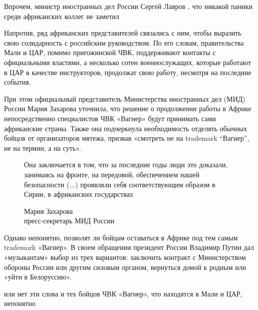 \begin{center}
    \Large

    Впрочем, министр иностранных дел России Сергей Лавров , что никакой паники среди африканских коллег не заметил
\end{center}

Напротив, ряд африканских представителей связались с ним, чтобы выразить свою солидарность с российским руководством. По его словам, правительства Мали и ЦАР, помимо пригожинской ЧВК, поддерживают контакты с официальными властями, а несколько сотен военнослужащих, которые работают в ЦАР в качестве инструкторов, продолжат свою работу, несмотря на последние события.

При этом официальный представитель Министерства иностранных дел (МИД) России Мария Захарова уточнила, что решение о продолжении работы в Африке непосредственно специалистов ЧВК «Вагнер» будут принимать сами африканские страны. Также она подчеркнула необходимость отделять обычных бойцов от организаторов мятежа, призвав «смотреть не на trademark ``Вагнер'', не на термин, а на суть».

\begin{figure}
    \begin{fancyquotes}
        Она заключается в том, что за последние годы люди это доказали, занимаясь на фронте, на передовой, обеспечением нашей безопасности (...) проявляли себя соответствующим образом в Сирии, в африканских государствах

        \begin{flushright}

            Мария Захарова\\

            пресс-секретарь МИД России
        \end{flushright}
    \end{fancyquotes}
\end{figure}
Однако непонятно, позволят ли бойцам оставаться в Африке под тем самым trademark «Вагнер». В своем обращении президент России Владимир Путин дал «музыкантам» выбор из трех вариантов: заключить контракт с Министерством обороны России или другим силовым органом, вернуться домой к родным или «уйти в Белоруссию».


\begin{center}
    \Large
     или нет эти слова и тех бойцов ЧВК «Вагнер», что находятся в Мали и ЦАР, непонятно
\end{center}


